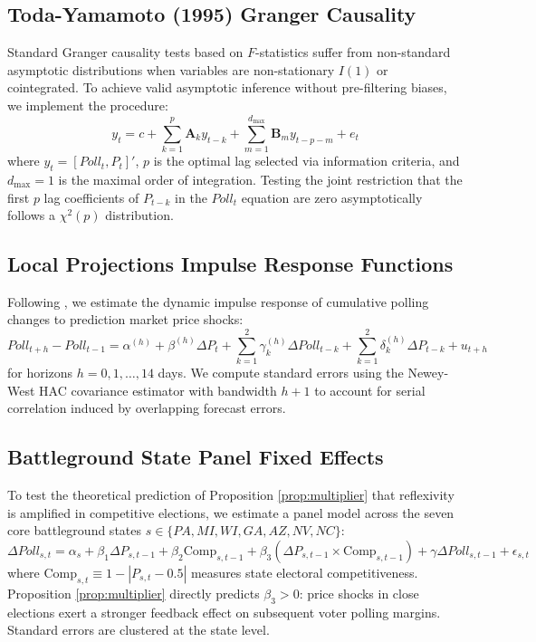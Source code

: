 \documentclass[12pt]{article}
\begin{document}
\subsection{Toda-Yamamoto (1995) Granger Causality}
Standard Granger causality tests based on $F$-statistics suffer from non-standard asymptotic distributions when variables are non-stationary $I(1)$ or cointegrated. To achieve valid asymptotic inference without pre-filtering biases, we implement the \citet{toda1995statistical} procedure:
\begin{equation}
y_t = c + \sum_{k=1}^p \mathbf{A}_k y_{t-k} + \sum_{m=1}^{d_{\max}} \mathbf{B}_m y_{t-p-m} + e_t
\end{equation}
where $y_t = [Poll_t, P_t]'$, $p$ is the optimal lag selected via information criteria, and $d_{\max} = 1$ is the maximal order of integration. Testing the joint restriction that the first $p$ lag coefficients of $P_{t-k}$ in the $Poll_t$ equation are zero asymptotically follows a $\chi^2(p)$ distribution.

\subsection{Local Projections Impulse Response Functions}
Following \citet{jorda2005estimation}, we estimate the dynamic impulse response of cumulative polling changes to prediction market price shocks:
\begin{equation}
Poll_{t+h} - Poll_{t-1} = \alpha^{(h)} + \beta^{(h)} \Delta P_t + \sum_{k=1}^2 \gamma_k^{(h)} \Delta Poll_{t-k} + \sum_{k=1}^2 \delta_k^{(h)} \Delta P_{t-k} + u_{t+h}
\end{equation}
for horizons $h = 0, 1, \dots, 14$ days. We compute standard errors using the Newey-West HAC covariance estimator with bandwidth $h+1$ to account for serial correlation induced by overlapping forecast errors.

\subsection{Battleground State Panel Fixed Effects}
To test the theoretical prediction of Proposition \ref{prop:multiplier} that reflexivity is amplified in competitive elections, we estimate a panel model across the seven core battleground states $s \in \{PA, MI, WI, GA, AZ, NV, NC\}$:
\begin{equation}
\Delta Poll_{s,t} = \alpha_s + \beta_1 \Delta P_{s,t-1} + \beta_2 \text{Comp}_{s,t-1} + \beta_3 (\Delta P_{s,t-1} \times \text{Comp}_{s,t-1}) + \gamma \Delta Poll_{s,t-1} + \epsilon_{s,t}
\end{equation}
where $\text{Comp}_{s,t} \equiv 1 - |P_{s,t} - 0.5|$ measures state electoral competitiveness. Proposition \ref{prop:multiplier} directly predicts $\beta_3 > 0$: price shocks in close elections exert a stronger feedback effect on subsequent voter polling margins. Standard errors are clustered at the state level.
\end{document}
